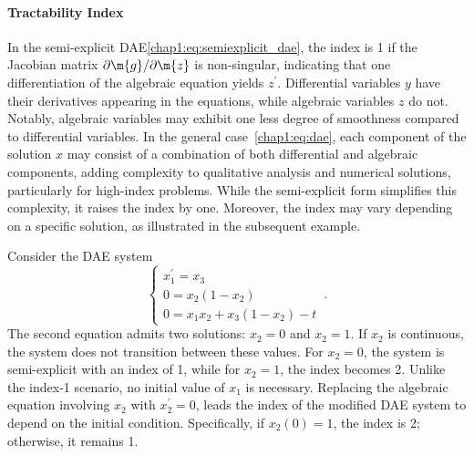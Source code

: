 \paragraph{Tractability Index}

In the semi-explicit \ac{DAE}\eqref{chap1:eq:semiexplicit_dae}, the index is 1 if the Jacobian matrix $\partial\m{g}/\partial\m{z}$ is non-singular, indicating that one differentiation of the algebraic equation yields $z^{\prime}$. Differential variables $y$ have their derivatives appearing in the equations, while algebraic variables $z$ do not. Notably, algebraic variables may exhibit one less degree of smoothness compared to differential variables. In the general case~\eqref{chap1:eq:dae}, each component of the solution $x$ may consist of a combination of both differential and algebraic components, adding complexity to qualitative analysis and numerical solutions, particularly for high-index problems. While the semi-explicit form simplifies this complexity, it raises the index by one. Moreover, the index may vary depending on a specific solution, as illustrated in the subsequent example.

\begin{example}
  Consider the \ac{DAE} system
  \begin{equation*}
    \begin{cases}
    x_1^{\prime} = x_3 \\
    0 = x_2(1 - x_2) \\
    0 = x_1x_2 + x_3(1 - x_2) - t
    \end{cases} \, \text{.}
  \end{equation*}
  The second equation admits two solutions: $x_2 = 0$ and $x_2 = 1$. If $x_2$ is continuous, the system does not transition between these values. For $x_2 = 0$, the system is semi-explicit with an index of 1, while for $x_2 = 1$, the index becomes 2. Unlike the index-1 scenario, no initial value of $x_1$ is necessary. Replacing the algebraic equation involving $x_2$ with $x_2^{\prime} = 0$, leads the index of the modified \ac{DAE} system to depend on the initial condition. Specifically, if $x_2(0) = 1$, the index is 2; otherwise, it remains 1.
\end{example}

